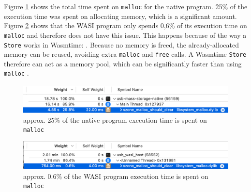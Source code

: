 Figure \ref{fig:malloc_instruments} shows the total time spent on \texttt{malloc} for the native program. 25\% of the execution time was spent on allocating memory, which is a significant amount. Figure \ref{fig:malloc_wasi_instruments} shows that the \acrshort{WASI} program only spends 0,6\% of its execution time on \texttt{malloc} and therefore does not have this issue. This happens because of the way a \texttt{Store} works in Wasmtime:  \cite{wasmtime_store}. Because no memory is freed, the already-allocated memory can be reused, avoiding extra \texttt{malloc} and \texttt{free} calls. A Wasmtime \texttt{Store} therefore can act as a memory pool, which can be significantly faster than using \texttt{malloc} \cite{memory_pool_wikipedia}.


\begin{figure}[H]
  \centering
  \includegraphics[width=1\textwidth]{images/malloc_screenshot.png}
  \caption{approx. 25\% of the native program execution time is spent on \texttt{malloc}}
  \label{fig:malloc_instruments}
\end{figure}

\begin{figure}[H]
  \centering
  \includegraphics[width=1\textwidth]{images/malloc_wasi_screenshot.png}
  \caption{approx. 0.6\% of the \acrshort{WASI} program execution time is spent on \texttt{malloc}}
  \label{fig:malloc_wasi_instruments}
\end{figure}

